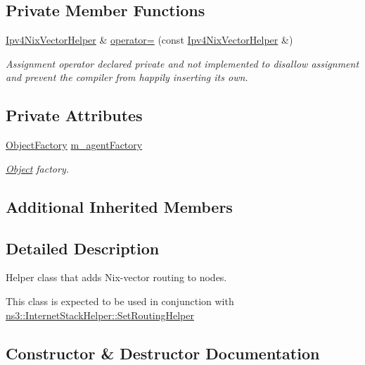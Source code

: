 \subsection*{Private Member Functions}
\begin{DoxyCompactItemize}
\item 
\hyperlink{classns3_1_1Ipv4NixVectorHelper}{Ipv4\+Nix\+Vector\+Helper} \& \hyperlink{classns3_1_1Ipv4NixVectorHelper_af861c9fc049610227306171df5ddac49}{operator=} (const \hyperlink{classns3_1_1Ipv4NixVectorHelper}{Ipv4\+Nix\+Vector\+Helper} \&)
\begin{DoxyCompactList}\small\item\em Assignment operator declared private and not implemented to disallow assignment and prevent the compiler from happily inserting its own. \end{DoxyCompactList}\end{DoxyCompactItemize}
\subsection*{Private Attributes}
\begin{DoxyCompactItemize}
\item 
\hyperlink{classns3_1_1ObjectFactory}{Object\+Factory} \hyperlink{classns3_1_1Ipv4NixVectorHelper_a9bdd213cf5bcb983b33273ea573ae4f4}{m\+\_\+agent\+Factory}
\begin{DoxyCompactList}\small\item\em \hyperlink{classns3_1_1Object}{Object} factory. \end{DoxyCompactList}\end{DoxyCompactItemize}
\subsection*{Additional Inherited Members}


\subsection{Detailed Description}
Helper class that adds Nix-\/vector routing to nodes. 

This class is expected to be used in conjunction with \hyperlink{classns3_1_1InternetStackHelper_a3e382c02df022dec79952a7eca8cd5ba}{ns3\+::\+Internet\+Stack\+Helper\+::\+Set\+Routing\+Helper} 

\subsection{Constructor \& Destructor Documentation}
